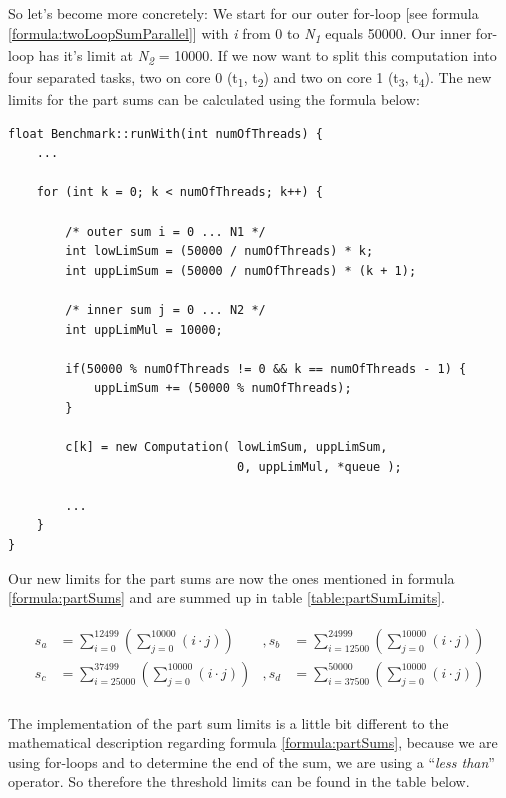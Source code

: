\noindent So let's become more concretely: We start for our outer for-loop [see formula \ref{formula:twoLoopSumParallel}] with \textit{i} from 0 to \textit{N\textsubscript{1}} equals 50000. Our inner for-loop has it's limit at \textit{N\textsubscript{2}} = 10000. If we now want to split this computation into four separated tasks, two on core 0 (t\textsubscript{1}, t\textsubscript{2}) and two on core 1 (t\textsubscript{3}, t\textsubscript{4}). The new limits for the part sums can be calculated using the formula below:

\begin{lstlisting}[label={code:calcLimits}]
float Benchmark::runWith(int numOfThreads) {
	...
	
	for (int k = 0; k < numOfThreads; k++) {
	
		/* outer sum i = 0 ... N1 */
		int lowLimSum = (50000 / numOfThreads) * k;
		int uppLimSum = (50000 / numOfThreads) * (k + 1);
		
		/* inner sum j = 0 ... N2 */
		int uppLimMul = 10000;
	
		if(50000 % numOfThreads != 0 && k == numOfThreads - 1) {
			uppLimSum += (50000 % numOfThreads);
		}
	
		c[k] = new Computation(	lowLimSum, uppLimSum, 
								0, uppLimMul, *queue );
		
		...
	}
}
\end{lstlisting}

Our new limits for the part sums are now the ones mentioned in formula \ref{formula:partSums} and are summed up in table \ref{table:partSumLimits}.

\newpage

\begin{align} \label{formula:partSums}
	\begin{aligned}
		s_a &= \sum_{i = 0}^{12499} \left( \sum_{j = 0}^{10000} \left(i \cdot j\right) \right) &, 
		s_b &= \sum_{i = 12500}^{24999} \left( \sum_{j = 0}^{10000} \left(i \cdot j\right) \right) \\
		s_c &= \sum_{i = 25000}^{37499} \left( \sum_{j = 0}^{10000} \left(i \cdot j\right) \right) &, 
		s_d &= \sum_{i = 37500}^{50000} \left( \sum_{j = 0}^{10000} \left(i \cdot j\right) \right)
	\end{aligned}
\end{align}\\

\noindent The implementation of the part sum limits is a little bit different to the mathematical description regarding formula \ref{formula:partSums}, because we are using for-loops and to determine the end of the sum, we are using a ``\textit{less than}'' operator. So therefore the threshold limits can be found in the table below.

